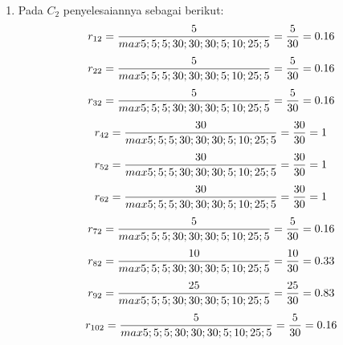 \documentclass[a4paper,twoside]{article}
\begin{document}
\begin{enumerate}
\begin{enumerate}
\item Pada $C_{2}$ penyelesaiannya sebagai berikut:
\begin{displaymath}
r_{12} = \frac{5}{max {5;5;5;30;30;30;5;10;25;5}} = \frac{5}{30} = 0.16\\
\end {displaymath}
\begin{displaymath}
r_{22} = \frac{5}{max {5;5;5;30;30;30;5;10;25;5}} = \frac{5}{30} = 0.16\\
\end{displaymath}
\begin{displaymath}
r_{32} = \frac{5}{max {5;5;5;30;30;30;5;10;25;5}} = \frac{5}{30} = 0.16\\
\end {displaymath}
\begin{displaymath}
r_{42} = \frac{30}{max {5;5;5;30;30;30;5;10;25;5}} = \frac{30}{30} = 1\\
\end {displaymath}
\begin{displaymath}
r_{52} = \frac{30}{max {5;5;5;30;30;30;5;10;25;5}} = \frac{30}{30} = 1\\
\end {displaymath}
\begin{displaymath}
r_{62} = \frac{30}{max {5;5;5;30;30;30;5;10;25;5}} = \frac{30}{30} = 1\\
\end {displaymath}
\begin{displaymath}
r_{72} = \frac{5}{max {5;5;5;30;30;30;5;10;25;5}} = \frac{5}{30} = 0.16\\
\end {displaymath}
\begin{displaymath}
r_{82} = \frac{10}{max {5;5;5;30;30;30;5;10;25;5}} = \frac{10}{30} = 0.33\\
\end {displaymath}
\begin{displaymath}
r_{92} = \frac{25}{max {5;5;5;30;30;30;5;10;25;5}} = \frac{25}{30} = 0.83\\
\end {displaymath}
\begin{displaymath}
r_{102} = \frac{5}{max {5;5;5;30;30;30;5;10;25;5}} = \frac{5}{30} = 0.16\\
\end {displaymath}


\end{enumerate}
\end{enumerate}
\end{document}
